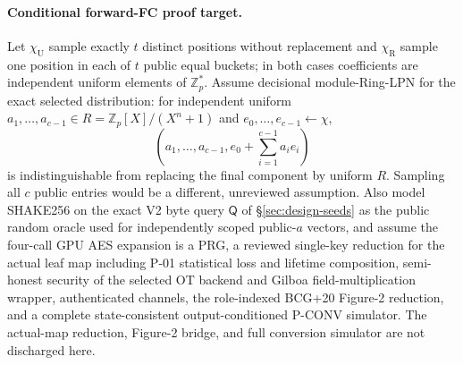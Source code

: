 \documentclass[11pt]{article}
\newcommand{\Z}{\mathbb{Z}}
\begin{document}
\paragraph{Conditional forward-FC proof target.}
Let $\chi_{\mathrm U}$ sample exactly $t$ distinct positions without
replacement and $\chi_{\mathrm R}$ sample one position in each of $t$ public
equal buckets; in both cases coefficients are independent uniform elements of
$\Z_p^*$. Assume decisional module-Ring-LPN for the exact selected distribution:
for independent uniform $a_1,\ldots,a_{c-1}\in R=\Z_p[X]/(X^n+1)$ and
$e_0,\ldots,e_{c-1}\leftarrow\chi$,
\[
 (a_1,\ldots,a_{c-1},e_0+\sum_{i=1}^{c-1}a_i e_i)
\]
is indistinguishable from replacing the final component by uniform $R$.
Sampling all $c$ public entries would be a different, unreviewed assumption.
Also model SHAKE256 on the exact V2 byte query $\mathsf Q$ of
\S\ref{sec:design-seeds} as the public random oracle used for independently
scoped public-$a$ vectors, and assume the four-call GPU AES expansion is a PRG,
a reviewed single-key reduction for the actual leaf map including P-01
statistical loss and lifetime composition, semi-honest security of the selected
OT backend and Gilboa field-multiplication wrapper, authenticated channels,
the role-indexed BCG+20 Figure-2 reduction, and a complete state-consistent
output-conditioned P-CONV simulator. The actual-map reduction, Figure-2 bridge,
and full conversion simulator are not discharged here.
\end{document}
